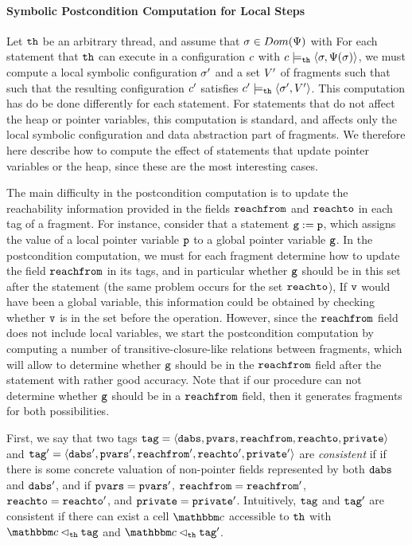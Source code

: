 \paragraph{Symbolic Postcondition Computation for Local Steps}
Let ${\tt th}$ be an arbitrary thread, and assume 
that $\sigma \in Dom(\Psi)$ with
For each statement that ${\tt th}$ can execute in a configuration $c$
with $c \models_{{\tt th}} \left\langle\sigma,\Psi(\sigma)\right\rangle$,
we must compute a local symbolic configuration $\sigma'$ and
a set  $V'$ of fragments such that
such that the resulting configuration $c'$ satisfies
  $c' \models_{{\tt th}} \left\langle\sigma',V'\right\rangle$.
This computation has do be done differently for
each statement. For statements that do not affect the heap or pointer variables,
this computation is standard, and affects only the local symbolic
configuration and data abstraction part of fragments.
We therefore here describe how to compute the effect of statements that update
pointer variables or the heap, since these are the most interesting cases.


The main difficulty in the
postcondition computation is to update the reachability information provided
in the fields $\mathtt{reachfrom}$ and $\mathtt{reachto}$ in each tag of a 
fragment. For instance, consider that a statement $\mathtt{g} := \mathtt{p}$,
which assigns the value of a local pointer variable $\mathtt{p}$ to a global
pointer variable $\mathtt{g}$.
In the postcondition computation, we must for each fragment
determine how to update the field $\mathtt{reachfrom}$ in its tags, and in particular
whether $\mathtt{g}$ should be in this set after the statement
(the same problem occurs for the set $\mathtt{reachto}$),
If $\mathtt{v}$ would have been a global variable, this information could
be obtained by checking whether $\mathtt{v}$ is in the set before the operation.
However, since the $\mathtt{reachfrom}$ field does not include local variables, we
start the postcondition computation by computing a number of
transitive-closure-like relations between fragments, which will allow
to determine whether $\mathtt{g}$ should be in the $\mathtt{reachfrom}$ field after
the statement with rather good accuracy. Note that if our procedure can not
determine whether $\mathtt{g}$ should be in  a $\mathtt{reachfrom}$ field, then it
generates fragments for both possibilities.

First, we say that two tags
$\mathtt{tag} = \left\langle\mathtt{dabs},\mathtt{pvars},\mathtt{reachfrom},\mathtt{reachto},\mathtt{private}\right\rangle$ and $\mathtt{tag}' = \left\langle\mathtt{dabs}',\mathtt{pvars}',\mathtt{reachfrom}',\mathtt{reachto}',\mathtt{private}'\right\rangle$ are {\em consistent} if
if there is some concrete valuation of non-pointer fields represented by both
$\mathtt{dabs}$ and $\mathtt{dabs}'$, and if
$\mathtt{pvars} = \mathtt{pvars}'$, $\mathtt{reachfrom} = \mathtt{reachfrom}'$, $\mathtt{reachto} = \mathtt{reachto}'$, and
$\mathtt{private} = \mathtt{private}'$.
Intuitively, $\mathtt{tag}$ and $\mathtt{tag}'$ are consistent if there can exist a cell
$\cell$ accessible to ${\tt th}$ with $\cell \satfrag{\thread} \atag$
and $\cell \satfrag{\thread} \atag'$.

